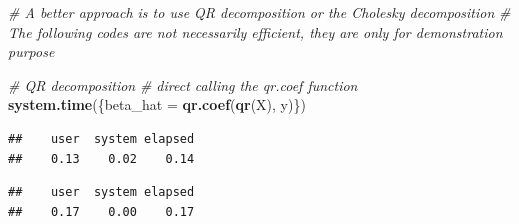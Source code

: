 \documentclass[
]{book}
\newenvironment{Shaded}{\begin{snugshade}}{\end{snugshade}}
\newcommand{\CommentTok}[1]{\textcolor[rgb]{0.56,0.35,0.01}{\textit{#1}}}
\newcommand{\KeywordTok}[1]{\textcolor[rgb]{0.13,0.29,0.53}{\textbf{#1}}}
\newcommand{\NormalTok}[1]{#1}
\newcommand{\OperatorTok}[1]{\textcolor[rgb]{0.81,0.36,0.00}{\textbf{#1}}}
\newcommand{\StringTok}[1]{\textcolor[rgb]{0.31,0.60,0.02}{#1}}
\begin{document}
\begin{Shaded}
\begin{Highlighting}[]
    \CommentTok{# A better approach is to use QR decomposition or the Cholesky decomposition }
    \CommentTok{# The following codes are not necessarily efficient, they are only for demonstration purpose}
    
    \CommentTok{# QR decomposition}
    \CommentTok{# direct calling the qr.coef function}
    \KeywordTok{system.time}\NormalTok{(\{beta_hat =}\StringTok{ }\KeywordTok{qr.coef}\NormalTok{(}\KeywordTok{qr}\NormalTok{(X), y)\})}
\end{Highlighting}
\end{Shaded}

\begin{verbatim}
##    user  system elapsed 
##    0.13    0.02    0.14
\end{verbatim}

\begin{Shaded}
\end{Shaded}

\begin{verbatim}
##    user  system elapsed 
##    0.17    0.00    0.17
\end{verbatim}
\end{document}
